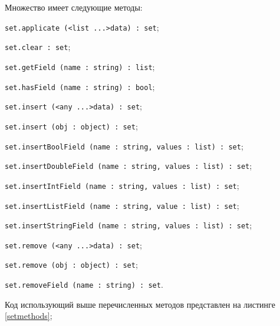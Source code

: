 Множество имеет следующие методы:
\begin{icItems}
\item \lstinline|set.applicate (<list ...>data) : set|;
\item \lstinline|set.clear : set|;
\item \lstinline|set.getField (name : string) : list|;
\item \lstinline|set.hasField (name : string) : bool|;
\item \lstinline|set.insert (<any ...>data) : set|;
\item \lstinline|set.insert (obj : object) : set|;
\item \lstinline|set.insertBoolField (name : string, values : list) : set|;
\item \lstinline|set.insertDoubleField (name : string, values : list) : set|;
\item \lstinline|set.insertIntField (name : string, values : list) : set|;
\item \lstinline|set.insertListField (name : string, value : list) : set|;
\item \lstinline|set.insertStringField (name : string, values : list) : set|;
\item \lstinline|set.remove (<any ...>data) : set|;
\item \lstinline|set.remove (obj : object) : set|;
\item \lstinline|set.removeField (name : string) : set|.
\end{icItems}

Код использующий выше перечисленных методов представлен на листинге \ref{setmethods};

